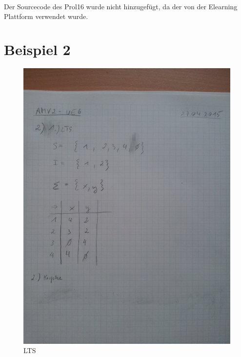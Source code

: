 \documentclass[12pt,a4paper]{article}
\begin{document}
Der Sourcecode des Prol16 wurde nicht hinzugefügt, da der von der Elearning Plattform verwendet wurde.







%





\newpage
\section{Beispiel 2}

\begin{figure}[ht!]
\centering
\includegraphics[width=\textwidth]{1.jpg}
\caption{LTS}
\end{figure}
\end{document}
